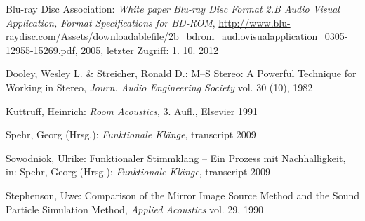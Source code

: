 
\listoffigures %
\listoftables %


\begin{thebibliography}{}

Blu-ray Disc Association: 
\emph{White paper Blu-ray Disc Format 2.B Audio Visual Application, Format Specifications for BD-ROM}, 
\url{http://www.blu-raydisc.com/Assets/downloadablefile/2b_bdrom_audiovisualapplication_0305-12955-15269.pdf}, 2005, letzter Zugriff: 1. 10. 2012

Dooley, Wesley L.  \& Streicher, Ronald D.:
\glqq M--S Stereo: A Powerful Technique for Working in Stereo\grqq, 
\emph{Journ. Audio Engineering Society} vol. 30 (10), 1982

Kuttruff, Heinrich: 
\emph{Room Acoustics}, 3. Aufl., Elsevier 1991

Spehr, Georg (Hrsg.): 
\emph{Funktionale Klänge}, transcript 2009

Sowodniok, Ulrike: 
\glqq Funktionaler Stimmklang -- Ein Prozess mit Nachhalligkeit\grqq, 
in: Spehr, Georg (Hrsg.): \emph{Funktionale Klänge}, transcript 2009

Stephenson, Uwe: 
\glqq Comparison of the Mirror Image Source Method and the Sound Particle Simulation Method\grqq, 
\emph{Applied Acoustics} vol. 29, 1990


\end{thebibliography}

\clearpage\thispagestyle{empty}
\eigen  %













